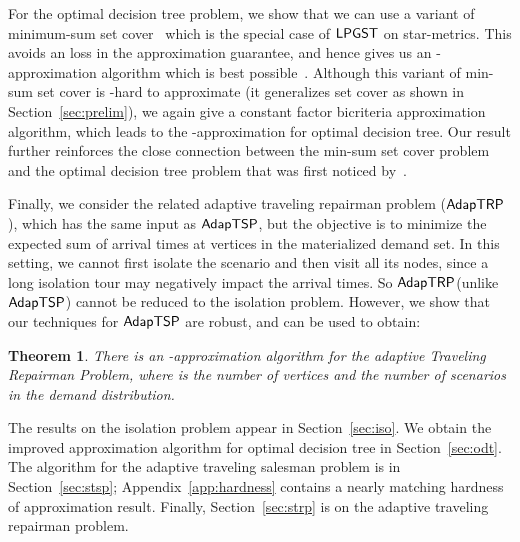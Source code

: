 \documentclass[11pt]{article}
\newtheorem{theorem}[thm]{Theorem}
\def\stsp{\ensuremath{{\sf AdapTSP}}\xspace}
\def\strp{\ensuremath{{\sf AdapTRP}}\xspace}
\def\lpgst{\ensuremath{{\sf LPGST}}\xspace}
\def\dtp{optimal decision tree problem\xspace}
\begin{document}
For the \dtp, we show that we can use a variant of minimum-sum set cover~\cite{FLT04} which is the special case of \lpgst on star-metrics. This avoids an  loss in the approximation guarantee, and hence gives us an -approximation algorithm which is best possible~\cite{CPRAM11}. Although this  variant of min-sum set cover is -hard to approximate (it
generalizes set cover as shown in Section~\ref{sec:prelim}), we again give a constant factor bicriteria approximation algorithm, which leads to the -approximation for optimal decision tree. Our result further reinforces the close connection between the min-sum set
cover problem and the \dtp that was first noticed by~\cite{CPRAM11}.

Finally, we consider the related adaptive traveling repairman problem (\strp), which has the same input as \stsp, but
the objective is to minimize the expected sum of arrival times at vertices in the materialized demand set. In this setting, we
cannot first isolate the scenario and then visit all its nodes, since a long isolation tour may negatively impact the
arrival times. So \strp (unlike \stsp) cannot be reduced to the isolation problem. However, we show that our techniques for \stsp
are robust, and can be used to obtain:
\begin{theorem}
  \label{thm:main3}
  There is an -approximation algorithm for
  the adaptive Traveling Repairman Problem, where  is the number of vertices and  the number of scenarios in the
  demand distribution.
\end{theorem}

\medskip
{} The results on the isolation problem appear in Section~\ref{sec:iso}. We obtain the improved approximation algorithm for
optimal decision tree in Section~\ref{sec:odt}. The algorithm for the adaptive traveling salesman problem is in Section~\ref{sec:stsp}; Appendix~\ref{app:hardness} contains a nearly matching  hardness of approximation result. Finally, Section~\ref{sec:strp} is on the adaptive traveling repairman problem.
\end{document}

